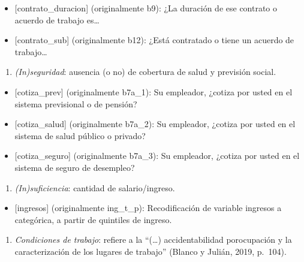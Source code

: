\documentclass[
]{article}
\providecommand{\tightlist}{%
  \setlength{\itemsep}{0pt}\setlength{\parskip}{0pt}}
\begin{document}
\begin{itemize}
\tightlist
\item
  {[}contrato\_duracion{]} (originalmente b9): ¿La duración de ese
  contrato o acuerdo de trabajo es\ldots{}
\item
  {[}contrato\_sub{]} (originalmente b12): ¿Está contratado o tiene un
  acuerdo de trabajo\ldots{}
\end{itemize}

\begin{enumerate}
\def\labelenumi{\arabic{enumi}.}
\tightlist
\item
  \emph{(In)seguridad}: ausencia (o no) de cobertura de salud y
  previsión social.
\end{enumerate}

\begin{itemize}
\tightlist
\item
  {[}cotiza\_prev{]} (originalmente b7a\_1): Su empleador, ¿cotiza por
  usted en el sistema previsional o de pensión?
\item
  {[}cotiza\_salud{]} (originalmente b7a\_2): Su empleador, ¿cotiza por
  usted en el sistema de salud público o privado?
\item
  {[}cotiza\_seguro{]} (originalmente b7a\_3): Su empleador, ¿cotiza por
  usted en el sistema de seguro de desempleo?
\end{itemize}

\begin{enumerate}
\def\labelenumi{\arabic{enumi}.}
\tightlist
\item
  \emph{(In)suficiencia}: cantidad de salario/ingreso.
\end{enumerate}

\begin{itemize}
\tightlist
\item
  {[}ingresos{]} (originalmente ing\_t\_p): Recodificación de variable
  ingresos a categórica, a partir de quintiles de ingreso.
\end{itemize}

\begin{enumerate}
\def\labelenumi{\arabic{enumi}.}
\tightlist
\item
  \emph{Condiciones de trabajo}: refiere a la ``(\ldots)
  accidentabilidad porocupación y la caracterización de los lugares de
  trabajo'' (Blanco y Julián, 2019, p.~104).
\end{enumerate}
\end{document}

